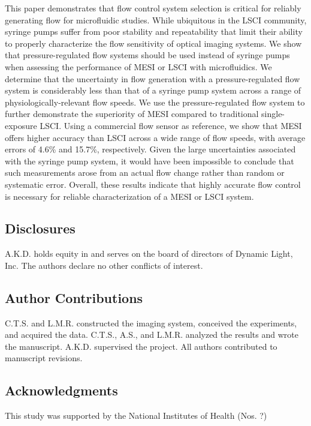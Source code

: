 \documentclass[12pt]{spieman}
\begin{document}
\begin{spacing}{2}
This paper demonstrates that flow control system selection is critical for reliably generating flow for microfluidic studies. While ubiquitous in the LSCI community, syringe pumps suffer from poor stability and repeatability that limit their ability to properly characterize the flow sensitivity of optical imaging systems. We show that pressure-regulated flow systems should be used instead of syringe pumps when assessing the performance of MESI or LSCI with microfluidics. We determine that the uncertainty in flow generation with a pressure-regulated flow system is considerably less than that of a syringe pump system across a range of physiologically-relevant flow speeds. We use the pressure-regulated flow system to further demonstrate the superiority of MESI compared to traditional single-exposure LSCI. Using a commercial flow sensor as reference, we show that MESI offers higher accuracy than LSCI across a wide range of flow speeds, with average errors of 4.6\% and 15.7\%, respectively. Given the large uncertainties associated with the syringe pump system, it would have been impossible to conclude that such measurements arose from an actual flow change rather than random or systematic error. Overall, these results indicate that highly accurate flow control is necessary for reliable characterization of a MESI or LSCI system.


\subsection*{Disclosures}
A.K.D. holds equity in and serves on the board of directors of Dynamic Light, Inc. The authors declare no other conflicts of interest.

\subsection*{Author Contributions}
C.T.S. and L.M.R. constructed the imaging system, conceived the experiments, and acquired the data. C.T.S., A.S., and L.M.R. analyzed the results and wrote the manuscript. A.K.D. supervised the project. All authors contributed to manuscript revisions.

\subsection*{Acknowledgments}
This study was supported by the National Institutes of Health (Nos. ?)


\end{spacing}
\end{document}
